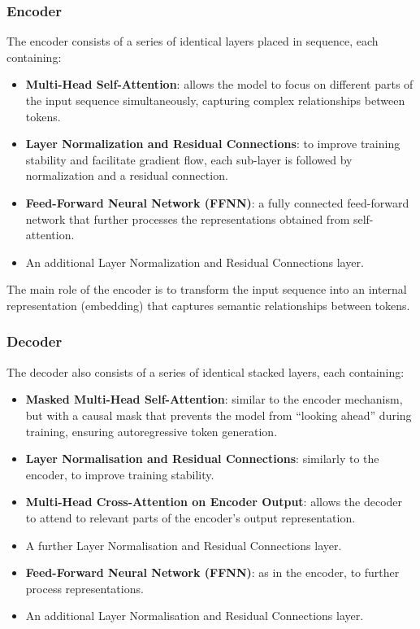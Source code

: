 \subsubsection{Encoder}
The encoder consists of a series of identical layers placed in sequence, each containing:
\begin{itemize}
    \item \textbf{Multi-Head Self-Attention}: allows the model to focus on different parts of the
          input sequence simultaneously, capturing complex relationships between tokens.
    \item \textbf{Layer Normalization and Residual Connections}: to improve training stability and
          facilitate gradient flow, each sub-layer is followed by normalization and a residual
          connection.
    \item \textbf{Feed-Forward Neural Network (FFNN)}: a fully connected feed-forward network that
          further processes the representations obtained from self-attention.
    \item An additional Layer Normalization and Residual Connections layer.
\end{itemize}
The main role of the encoder is to transform the input sequence into an internal representation
(embedding) that captures semantic relationships between tokens.

\subsubsection{Decoder}
The decoder also consists of a series of identical stacked layers, each containing:
\begin{itemize}
    \item \textbf{Masked Multi-Head Self-Attention}: similar to the encoder mechanism, but with a
          causal mask that prevents the model from ``looking ahead'' during training, ensuring
          autoregressive token generation.
    \item \textbf{Layer Normalisation and Residual Connections}: similarly to the encoder, to
          improve training stability.
    \item \textbf{Multi-Head Cross-Attention on Encoder Output}: allows the decoder to attend to
          relevant parts of the encoder's output representation.
    \item A further Layer Normalisation and Residual Connections layer.
    \item \textbf{Feed-Forward Neural Network (FFNN)}: as in the encoder, to further process
          representations.
    \item An additional Layer Normalisation and Residual Connections layer.
\end{itemize}


